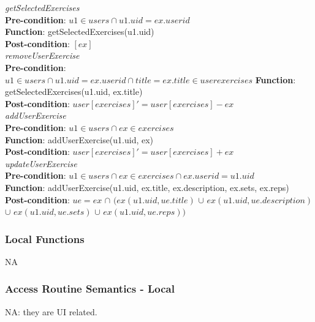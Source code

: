 \documentclass[12pt, titlepage]{article}
\begin{document}
\newline
\textit{getSelectedExercises}\\
\textbf{Pre-condition}: $u1 \in users \cap u1.uid = ex.userid$ \\
\textbf{Function}: getSelectedExercises(u1.uid) \\
\textbf{Post-condition}: $[ex]$ \\
\newline
\textit{removeUserExercise}\\
\textbf{Pre-condition}: $u1 \in users \cap u1.uid = ex.userid \cap title = ex.title \in userexercises$
\textbf{Function}: getSelectedExercises(u1.uid, ex.title) \\
\textbf{Post-condition}: $user[exercises]' = user[exercises] - ex$ \\
\newline
\textit{addUserExercise}\\
\textbf{Pre-condition}: $u1 \in users \cap ex \in exercises$ \\
\textbf{Function}: addUserExercise(u1.uid, ex)\\
\textbf{Post-condition}: $user[exercises]' = user[exercises] + ex$\\
\newline
\textit{updateUserExercise}\\
\textbf{Pre-condition}: $u1 \in users \cap ex \in exercises \cap ex.userid = u1.uid$ \\
\textbf{Function}: addUserExercise(u1.uid, ex.title, ex.description, ex.sets, ex.reps)\\
\textbf{Post-condition}: $ue = ex$ $\cap$ $(ex(u1.uid, ue.title)$ $\cup$ $ex(u1.uid, ue.description)$
$\cup$ $ex(u1.uid, ue.sets)$ $\cup$ $ex(u1.uid, ue.reps))$

\subsubsection{Local Functions}
NA \\

\subsubsection{Access Routine Semantics - Local}
NA: they are UI related.


\end{document}
